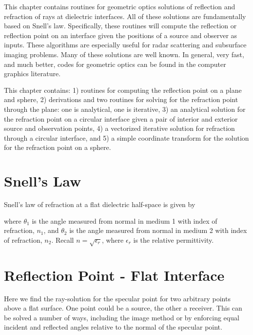 


This chapter contains routines for geometric optics solutions of reflection and refraction of rays at dielectric interfaces. All of these solutions are fundamentally based on Snell's law. Specifically, these routines will compute the reflection or reflection point on an interface given the positions of a source and observer as inputs. These algorithms are especially useful for radar scattering and subsurface imaging problems. Many of these solutions are well known. In general, very fast, and much better, codes for geometric optics can be found in the computer graphics literature.

This chapter contains: 1) routines for computing the reflection point on a plane and sphere, 2) derivations and two routines for solving for the refraction point through the plane: one is analytical, one is iterative, 3) an analytical solution for the refraction point on a circular interface given a pair of interior and exterior source and observation points, 4) a vectorized iterative solution for refraction through a circular interface, and 5) a simple coordinate transform for the solution for the refraction point on a sphere.



\section{Snell's Law}

Snell's law of refraction at a flat dielectric half-space is given by 

\noindent where $\theta_1$ is the angle measured from normal in medium 1 with index of refraction, $n_1$, and $\theta_2$ is the angle measured from normal in medium 2 with index of refraction, $n_2$. Recall $n = \sqrt{\epsilon_r}$, where $\epsilon_r$ is the relative permittivity.


%
%



\section{Reflection Point - Flat Interface}

Here we find the ray-solution for the specular point for two arbitrary points above a flat surface. One point could be a source, the other a receiver. This can be solved a number of ways, including the image method or by enforcing equal incident and reflected angles relative to the normal of the specular point.

